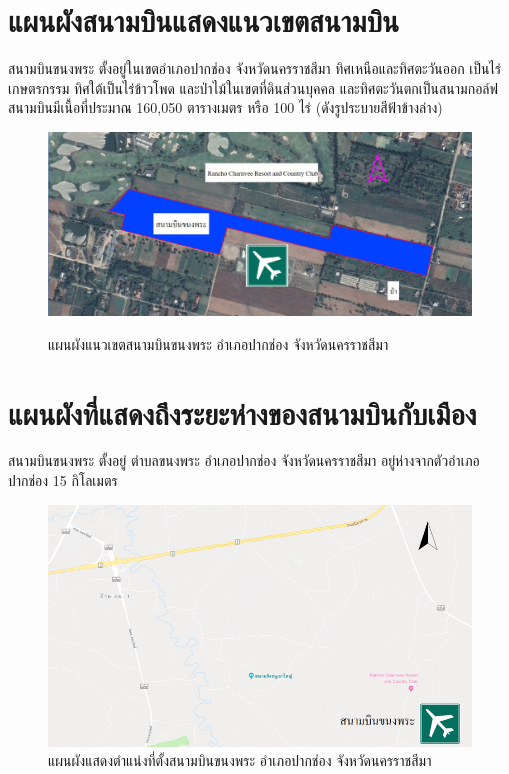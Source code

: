 \section{แผนผังสนามบินแสดงแนวเขตสนามบิน} \label{แผนผังสนามบินแสดงแนวเขตสนามบิน}

สนามบินขนงพระ ตั้งอยู่ในเขตอำเภอปากช่อง จังหวัดนครราชสีมา  ทิศเหนือและทิศตะวันออก เป็นไร่เกษตรกรรม ทิศใต้เป็นไร่ข้าวโพด และป่าไม้ในเขตที่ดินส่วนบุคคล  และทิศตะวันตกเป็นสนามกอล์ฟ  สนามบินมีเนื้อที่ประมาณ 160,050 ตารางเมตร หรือ 100 ไร่ (ดังรูประบายสีฟ้าข้างล่าง)                                      

\begin{figure}[h!]
\begin{center}
\includegraphics[width=\linewidth]{Picture5.png}
\caption{แผนผังแนวเขตสนามบินขนงพระ อำเภอปากช่อง จังหวัดนครราชสีมา}\label{แผนผังแนวเขตสนามบินขนงพระ อำเภอปากช่อง จังหวัดนครราชสีมา}
\label{default}
\end{center}
\end{figure}

\newpage
\section{แผนผังที่แสดงถึงระยะห่างของสนามบินกับเมือง}
	สนามบินขนงพระ ตั้งอยู่ ตำบลขนงพระ อำเภอปากช่อง  จังหวัดนครราชสีมา อยู่ห่างจากตัวอำเภอปากช่อง  15 กิโลเมตร 
\begin{figure}[ht!]
\begin{center}
\includegraphics[width=\linewidth]{Picture6.png}
\caption{แผนผังแสดงตำแน่งที่ตั้งสนามบินขนงพระ อำเภอปากช่อง  จังหวัดนครราชสีมา}
\label{default}
\end{center}
\end{figure}


